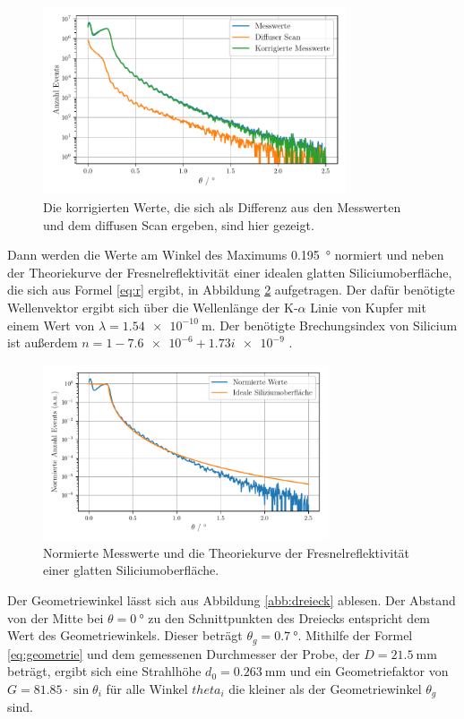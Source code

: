 \begin{figure}
    \centering
    \includegraphics[width=0.8\textwidth]{figures/messwerte_relativ.pdf}
    \caption{Die korrigierten Werte, die sich als Differenz aus den Messwerten und dem diffusen Scan ergeben, sind hier gezeigt.}
    \label{abb:diffus}
\end{figure}

Dann werden die Werte am Winkel des Maximums \SI{0.195}{\degree} normiert und neben der Theoriekurve der Fresnelreflektivität einer idealen glatten Siliciumoberfläche, die sich aus Formel \eqref{eq:r} ergibt, in Abbildung \ref{abb:norm} aufgetragen. Der dafür benötigte Wellenvektor ergibt sich über die Wellenlänge der K-$\alpha$ Linie von Kupfer mit einem Wert von $\lambda = \SI{1.54e-10}{\meter}$. 
Der benötigte Brechungsindex von Silicium ist außerdem $n = \num{1} - \num{7.6e-6} + \num{1.73i e-9}$ \cite{skript}.
\begin{figure}
    \centering
    \includegraphics[width=0.75\textwidth]{figures/messwerte_norm.pdf}
    \caption{Normierte Messwerte und die Theoriekurve der Fresnelreflektivität einer glatten Siliciumoberfläche.}
    \label{abb:norm}
\end{figure}

Der Geometriewinkel lässt sich aus Abbildung \ref{abb:dreieck} ablesen. Der Abstand von der Mitte bei $\theta = \SI{0}{\degree}$ zu den Schnittpunkten des Dreiecks entspricht dem Wert des Geometriewinkels. Dieser beträgt $\theta_g = \SI{0.7}{\degree}$. Mithilfe der Formel \eqref{eq:geometrie} und dem gemessenen Durchmesser der Probe, der $D = \SI{21.5}{\milli\metre}$ beträgt, ergibt sich eine Strahlhöhe $d_0 = \SI{0.263}{\milli\meter}$ und ein Geometriefaktor von $G = \num{81.85} \cdot \sin \theta_i$ für alle Winkel $theta_i$ die kleiner als der Geometriewinkel $\theta_g$ sind.

